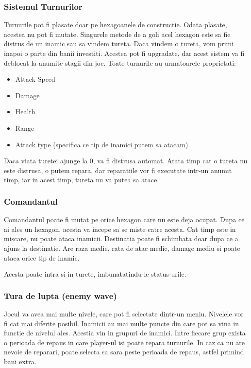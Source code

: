 \documentclass[12pt, a4paper]{article}
\begin{document}
	
	\subsubsection{Sistemul Turnurilor}
	
	Turnurile pot fi plasate doar pe hexagoanele de constructie. Odata plasate, acestea nu pot fi mutate. Singurele metode de a goli acel hexagon este sa fie distrus de un inamic sau sa vindem tureta. Daca vindem o tureta, vom primi inapoi o parte din banii investiti. Acestea pot fi upgradate, dar acest sistem va fi deblocat la anumite stagii din joc. Toate turnurile au urmatoarele proprietati:
	\begin{itemize}
		\item Attack Speed
		\item Damage
		\item Health
		\item Range
		\item Attack type (specifica ce tip de inamici putem sa atacam)
	\end{itemize}

	Daca viata turetei ajunge la 0, va fi distrusa automat. Atata timp cat o tureta nu este distrusa, o putem repara, dar reparatiile vor fi executate intr-un anumit timp, iar in acest timp, tureta nu va putea sa atace.
	
	\subsubsection{Comandantul}
	
	Comandantul poate fi mutat pe orice hexagon care nu este deja ocupat. Dupa ce ai ales un hexagon, acesta va incepe sa se miste catre acesta. Cat timp este in miscare, nu poate ataca inamicii. Destinatia poate fi schimbata doar dupa ce a ajuns la destinatie. Are raza medie, rata de atac medie, damage mediu si poate ataca orice tip de inamic.
	
	Acesta poate intra si in turete, imbunatatindu-le status-urile.
	
	\subsubsection{Tura de lupta (enemy wave)}
	
	Jocul va avea mai multe nivele, care pot fi selectate dintr-un meniu. Nivelele vor fi cat mai diferite posibil. Inamicii au mai multe puncte din care pot sa vina in functie de nivelul ales. Acestia vin in grupuri de inamici. Intre fiecare grup exista o perioada de repaus in care player-ul isi poate repara turnurile. In caz ca nu are nevoie de reparari, poate selecta sa sara peste perioada de repaus, astfel primind bani extra.
	
\end{document}
